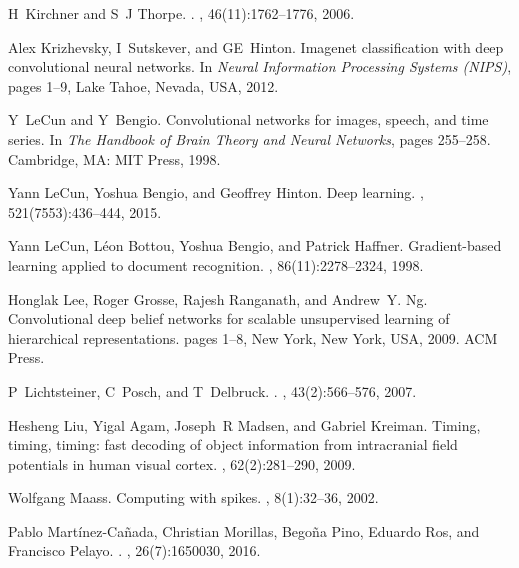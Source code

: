 \documentclass[preprint,5p,12pt,twocolumn]{article}
\begin{document}
\begin{thebibliography}{10}
H~Kirchner and S~J Thorpe.
.
, 46(11):1762--1776, 2006.

Alex Krizhevsky, I~Sutskever, and GE~Hinton.
\newblock Imagenet classification with deep convolutional neural networks.
\newblock In {\em Neural Information Processing Systems (NIPS)}, pages 1--9,
  Lake Tahoe, Nevada, USA, 2012.

Y~LeCun and Y~Bengio.
\newblock Convolutional networks for images, speech, and time series.
\newblock In {\em The Handbook of Brain Theory and Neural Networks}, pages
  255--258. Cambridge, MA: MIT Press, 1998.

Yann LeCun, Yoshua Bengio, and Geoffrey Hinton.
\newblock Deep learning.
, 521(7553):436--444, 2015.

Yann LeCun, L{\'e}on Bottou, Yoshua Bengio, and Patrick Haffner.
\newblock Gradient-based learning applied to document recognition.
, 86(11):2278--2324, 1998.

Honglak Lee, Roger Grosse, Rajesh Ranganath, and Andrew~Y. Ng.
\newblock Convolutional deep belief networks for scalable unsupervised learning
  of hierarchical representations.
\newblock pages 1--8, New York, New York, USA, 2009. ACM Press.

P~Lichtsteiner, C~Posch, and T~Delbruck.
.
, 43(2):566--576, 2007.

Hesheng Liu, Yigal Agam, Joseph~R Madsen, and Gabriel Kreiman.
\newblock Timing, timing, timing: fast decoding of object information from
  intracranial field potentials in human visual cortex.
, 62(2):281--290, 2009.

Wolfgang Maass.
\newblock Computing with spikes.
, 8(1):32--36, 2002.

Pablo Mart{\'{i}}nez-Ca{\~{n}}ada, Christian Morillas, Bego{\~{n}}a Pino,
  Eduardo Ros, and Francisco Pelayo.
.
, 26(7):1650030, 2016.


\end{thebibliography}
\end{document}
